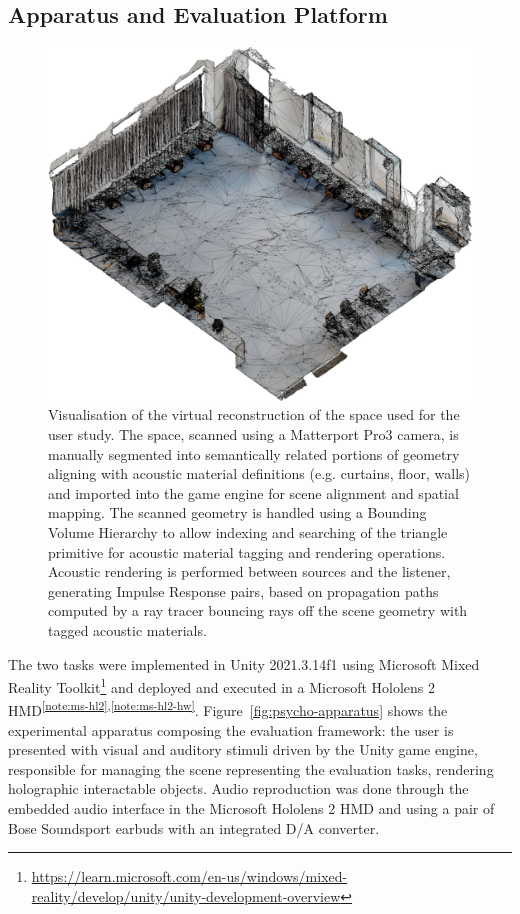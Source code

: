 \subsection{Apparatus and Evaluation Platform}
\begin{figure}[htbp]
    \centering
    \includegraphics[width=1\columnwidth]{7_evaluation/images/cst_isoview.png}
    \caption{Visualisation of the virtual reconstruction of the space used for the user study. The space, scanned using a Matterport Pro3 camera, is manually segmented into semantically related portions of geometry aligning with acoustic material definitions (e.g. curtains, floor, walls) and imported into the game engine for scene alignment and spatial mapping. The scanned geometry is handled using a Bounding Volume Hierarchy to allow indexing and searching of the triangle primitive for acoustic material tagging and rendering operations. Acoustic rendering is performed between sources and the listener, generating Impulse Response pairs, based on propagation paths computed by a ray tracer bouncing rays off the scene geometry with tagged acoustic materials.}
    \label{fig:cst-mesh}
\end{figure}
The two tasks were implemented in Unity 2021.3.14f1 using Microsoft Mixed Reality Toolkit\footnote{\url{https://learn.microsoft.com/en-us/windows/mixed-reality/develop/unity/unity-development-overview}} and deployed and executed in a Microsoft Hololens 2 HMD\textsuperscript{\ref{note:ms-hl2},\ref{note:ms-hl2-hw}}. Figure~\ref{fig:psycho-apparatus} shows the experimental apparatus composing the evaluation framework: the user is presented with visual and auditory stimuli driven by the Unity game engine, responsible for managing the scene representing the evaluation tasks, rendering holographic interactable objects. Audio reproduction was done through the embedded audio interface in the Microsoft Hololens 2 HMD and using a pair of Bose Soundsport earbuds with an integrated D/A converter.\par
